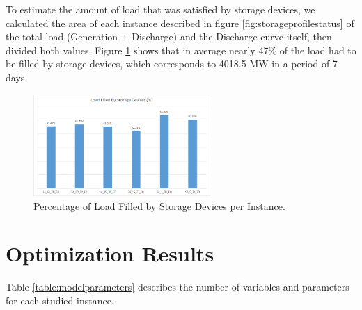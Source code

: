 \documentclass[12pt,LUDisStyle,twosided]{book}
\begin{document}
To estimate the amount of load that was satisfied by storage devices, we calculated the area of each instance described in figure \ref{fig:storageprofilestatus} of the total load (Generation + Discharge) and the Discharge curve itself, then divided both values. Figure \ref{fig:loadfilled} shows that in average nearly 47\% of the load had to be filled by storage devices, which corresponds to 4018.5 MW in a period of 7 days.

\begin{figure}[H] 
	\begin{center}
		\includegraphics[width=0.6\textwidth,keepaspectratio]{loadfilledstorage.png}
	  	\caption{Percentage of Load Filled by Storage Devices per Instance.}
     	\label{fig:loadfilled}
	\end{center}
\end{figure}

\newpage
\section{Optimization Results} \label{section:optimizationresults}

Table \ref{table:modelparameters} describes the number of variables and parameters for each studied instance. 
\end{document}
